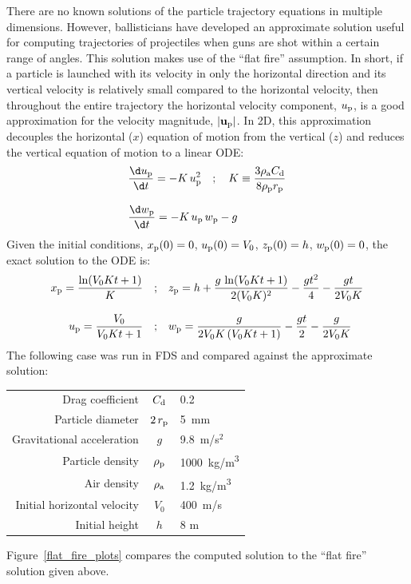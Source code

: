 \documentclass[11pt]{book}
\begin{document}
There are no known solutions of the particle trajectory equations in multiple dimensions. However, ballisticians have developed an approximate solution useful for computing trajectories of projectiles when guns are shot within a certain range of angles. This solution makes use of the ``flat fire'' assumption. In short, if a particle is launched with its velocity in only the horizontal direction and its vertical velocity is relatively small compared to the horizontal velocity, then throughout the entire trajectory the horizontal velocity component, $u_{\rm p}$, is a good approximation for the velocity magnitude, $|\mathbf{u_{\rm p}}|$. In 2D, this approximation decouples the horizontal ($x$) equation of motion from the vertical ($z$) and reduces the vertical equation of motion to a linear ODE:
\begin{align}
   &\frac{\d u_{\rm p}}{\d t} = -K \, u_{\rm p}^2 \quad ;  \quad K \equiv \frac{3 \rho_{\rm a} C_{\rm d}}{8 \rho_{\rm p} r_{\rm p}} \\[.1in]
   &\frac{\d w_{\rm p}}{\d t} = -K \, u_{\rm p} \, w_{\rm p} - g
\end{align}
Given the initial conditions, $x_{\rm p}(0) = 0$, $u_{\rm p}(0) = V_0$, $z_{\rm p}(0) = h$, $w_{\rm p}(0) = 0$, the exact solution to the ODE is:
\begin{align}
    x_{\rm p} = \frac{\ln(V_0 K t + 1)}{K} \quad ;& \quad
    z_{\rm p} = h + \frac{g \, \ln(V_0 K t + 1)}{2 (V_0 K)^2} - \frac{g t^2}{4} - \frac{g t}{2 V_0 K} \\[.1in]
    u_{\rm p} = \frac{V_0}{V_0 K t + 1} \quad ;& \quad w_{\rm p} = \frac{g}{2 V_0 K \, (V_0 K t + 1)} - \frac{g t}{2} - \frac{g}{2 V_0 K}
\end{align}
The following case was run in FDS and compared against the approximate solution:
\begin{center}
\begin{tabular}{|r|c|l|}
\hline
Drag coefficient                  & $C_{\rm d}$          & 0.2 \\
Particle diameter                 & $2\, r_{\rm p}$      & 5~mm \\
Gravitational acceleration        & $g$                  & 9.8~m/s$^2$ \\
Particle density                  & $\rho_{\rm p}$       & 1000~\si{kg/m^3} \\
Air density                       & $\rho_{\rm a}$       & 1.2~\si{kg/m^3} \\
Initial horizontal velocity       & $V_0$                & 400~m/s \\
Initial height                    & $h$                  & 8 m \\
\hline
\end{tabular}
\end{center}
Figure~\ref{flat_fire_plots} compares the computed solution to the ``flat fire'' solution given above.
\end{document}

